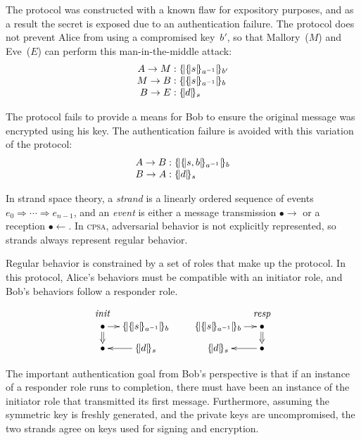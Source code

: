 \documentclass[titlepage,12pt]{article}
\newcommand{\cpsa}{\textsc{cpsa}}
\newcommand{\fn}[1]{\ensuremath{\operatorname{\mathit{#1}}}}
\newcommand{\enc}[2]{\ensuremath{\{\!|#1|\!\}_{#2}}}
\newcommand{\invk}[1]{{#1}^{-1}}
\newcommand{\init}{\fn{init}}
\newcommand{\resp}{\fn{resp}}
\begin{document}
The protocol was constructed with a known flaw for expository
purposes, and as a result the secret is exposed due to an
authentication failure.  The protocol does not prevent Alice from
using a compromised key~$b'$, so that Mallory~($M$) and Eve~($E$) can
perform this man-in-the-middle attack:
$$\begin{array}{r@{{}:{}}l}
A\to M&\enc{\enc{s}{\invk{a}}}{b'}\\
M\to B&\enc{\enc{s}{\invk{a}}}{b}\\
B\to E&\enc{d}{s}
\end{array}$$

The protocol fails to provide a means for Bob to ensure the original
message was encrypted using his key.  The authentication failure is
avoided with this variation of the protocol:
\begin{equation}\label{eq:amended protocol}
\begin{array}{r@{{}:{}}l}
A\to B&\enc{\enc{s,b}{\invk{a}}}{b}\\
B\to A&\enc{d}{s}
\end{array}
\end{equation}

In strand space theory, a \emph{strand} is a linearly
ordered sequence of events $e_0\Rightarrow\cdots\Rightarrow e_{n-1}$,
and an \emph{event} is either a message transmission
$\bullet\to$ or a reception $\bullet\gets$.  In {\cpsa}, adversarial
behavior is not explicitly represented, so strands always represent
regular behavior.

Regular behavior is constrained by a set of roles that make up the
protocol.  In this protocol, Alice's behaviors must be compatible with
an initiator role, and Bob's behaviors follow a responder role.
\begin{equation}\label{eq:protocol}
\begin{array}{r@{\qquad}l}
\xymatrix@=.6em{\raisebox{-1ex}[0ex][0ex]{\strut\init}\\
  \bullet\ar@{=>}[d]\ar[r]&\enc{\enc{s}{\invk{a}}}{b}\\
  \bullet&\enc{d}{s}\ar[l]}&
\xymatrix@=.6em{&\raisebox{-1ex}[0ex][0ex]{\strut\resp}\\
\enc{\enc{s}{\invk{a}}}{b}\ar[r]&\bullet\ar@{=>}[d]\\
\enc{d}{s}&\bullet\ar[l]}
\end{array}
\end{equation}

The important authentication goal from Bob's perspective is that if an
instance of a responder role runs to completion, there must have been
an instance of the initiator role that transmitted its first message.
Furthermore, assuming the symmetric key is freshly generated, and the
private keys are uncompromised, the two strands agree on keys used for
signing and encryption.
\end{document}
